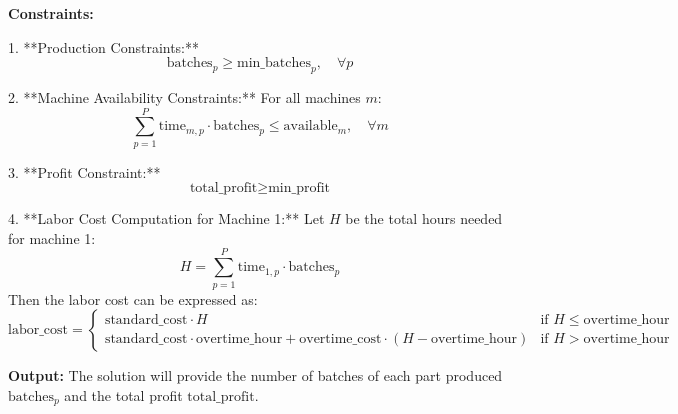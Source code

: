 \documentclass{article}
\begin{document}
\textbf{Constraints:}

1. **Production Constraints:**
   \[
   \text{batches}_{p} \geq \text{min\_batches}_{p}, \quad \forall p
   \]

2. **Machine Availability Constraints:**
   For all machines \( m \):
   \[
   \sum_{p=1}^{P} \text{time}_{m,p} \cdot \text{batches}_{p} \leq \text{available}_{m}, \quad \forall m
   \]

3. **Profit Constraint:**
   \[
   \text{total\_profit} \geq \text{min\_profit}
   \]

4. **Labor Cost Computation for Machine 1:**
   Let \( H \) be the total hours needed for machine 1:
   \[
   H = \sum_{p=1}^{P} \text{time}_{1,p} \cdot \text{batches}_{p}
   \]
   Then the labor cost can be expressed as:
   \[
   \text{labor\_cost} = 
   \begin{cases} 
   \text{standard\_cost} \cdot H & \text{if } H \leq \text{overtime\_hour} \\ 
   \text{standard\_cost} \cdot \text{overtime\_hour} + \text{overtime\_cost} \cdot (H - \text{overtime\_hour}) & \text{if } H > \text{overtime\_hour} 
   \end{cases}
   \]

\textbf{Output:}  
The solution will provide the number of batches of each part produced \( \text{batches}_{p} \) and the total profit \( \text{total\_profit} \).
\end{document}
